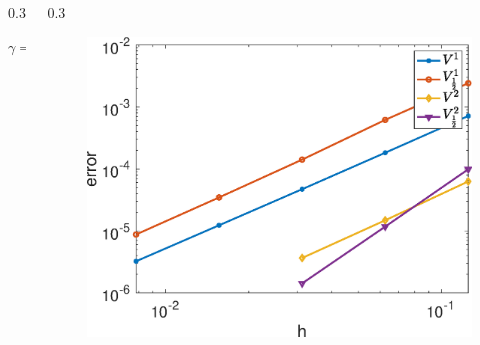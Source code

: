 \documentclass{msuposter}
\newcommand{\colwidth}{0.3\linewidth}
\begin{document}
\begin{frame}{}
\begin{columns}[t]
\begin{column}{\colwidth}
\begin{exampleblock}{$\gamma = 0.5$}
\end{exampleblock}

\end{column}
\begin{column}{\colwidth}
\begin{exampleblock}{}
\begin{figure}
\includegraphics[width=0.5\linewidth]{Figure1}
\end{figure}
\end{exampleblock}


\end{column}
\end{columns}
\end{frame}
\end{document}
